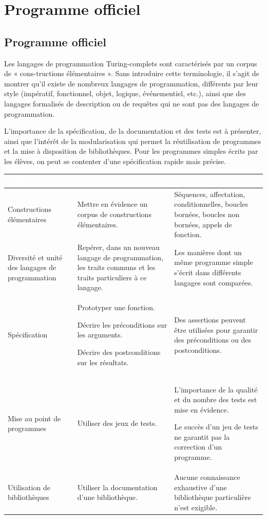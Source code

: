 \chapter*{Programme officiel}

\section*{Programme officiel}

Les langages de programmation Turing-complets sont caractérisés par un corpus de « cons-tructions élémentaires ». Sans introduire cette terminologie, il s'agit de montrer qu'il existe de nombreux langages de programmation, différents par leur style (impératif, fonctionnel, objet, logique, événementiel, etc.), ainsi que des langages formalisés de description ou de requêtes qui ne sont pas des langages de programmation.

L'importance de la spécification, de la documentation et des tests est à présenter, ainsi que l'intérêt de la modularisation qui permet la réutilisation de programmes et la mise à disposition de bibliothèques. Pour les programmes simples écrits par les élèves, on peut se contenter d'une spécification rapide mais précise.

{\centering\begin{tabular}{|L{3cm}|L{5.5cm}|L{6cm}|}\hline
{}\bfseries\textcolor{white}{Contenus}&
\bfseries\textcolor{white}{Capacités attendues}&
\bfseries\textcolor{white}{Commentaires}\\ \hline
Constructions élémentaires
&
Mettre en évidence un corpus de constructions élémentaires.
& Séquences, affectation, conditionnelles, boucles bornées, boucles non bornées, appels de fonction.\\ \hline
Diversité et unité des langages de programmation
&
Repérer, dans un nouveau langage de programmation, les traits communs et les traits particuliers à ce langage.
&
Les manières dont un même programme simple s'écrit dans différents langages sont comparées.\\ \hline
Spécification
&
Prototyper une fonction.

Décrire les préconditions sur les arguments.

Décrire des postconditions sur les résultats.
&
Des assertions peuvent être utilisées pour garantir des préconditions ou des postconditions.\\ \hline
Mise au point de programmes
&
Utiliser des jeux de tests.
&
L'importance de la qualité et du nombre des tests est mise en évidence.

Le succès d'un jeu de tests ne garantit pas la correction d'un programme.\\ \hline
Utilisation de bibliothèques
&
Utiliser la documentation d'une bibliothèque.
&
Aucune connaissance exhaustive d'une bibliothèque particulière n'est exigible.\\ \hline
\end{tabular}\par}


